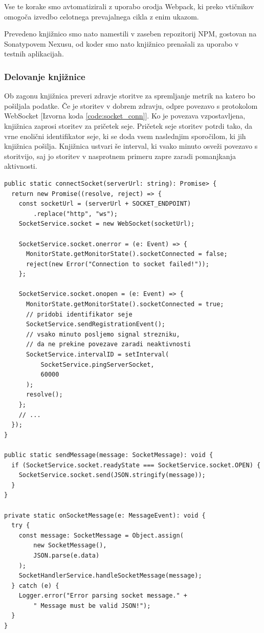 \documentclass[a4paper, 12pt]{book}
\begin{document}
Vse te korake smo avtomatizirali z uporabo orodja Webpack, ki preko vtičnikov omogoča izvedbo celotnega prevajalnega cikla z enim ukazom. 

Prevedeno knjižnico smo nato namestili v zaseben repozitorij NPM, gostovan na Sonatypovem Nexusu, od koder smo nato knjižnico prenašali za uporabo v testnih aplikacijah.

\subsubsection{Delovanje knjižnice}

Ob zagonu knjižnica preveri zdravje storitve za spremljanje metrik na katero bo pošiljala podatke. Če je storitev v dobrem zdravju, odpre povezavo s protokolom WebSocket [Izvorna koda \ref{code:socket_conn}]. Ko je povezava vzpostavljena, knjižnica zaprosi storitev za pričetek seje. Pričetek seje storitev potrdi tako, da vrne enolični identifikator seje, ki se doda vsem naslednjim sporočilom, ki jih knjižnica pošilja. Knjižnica ustvari še interval, ki vsako minuto osveži povezavo s storitvijo, saj jo storitev v nasprotnem primeru zapre zaradi pomanjkanja aktivnosti.

\begin{lstlisting}[label=code:socket_conn, caption=Odpiranje WebSocket povezave in metode za upravljanje WebSocket akcij]
public static connectSocket(serverUrl: string): Promise> {
  return new Promise((resolve, reject) => {
    const socketUrl = (serverUrl + SOCKET_ENDPOINT)
        .replace("http", "ws");
    SocketService.socket = new WebSocket(socketUrl);

    SocketService.socket.onerror = (e: Event) => {
      MonitorState.getMonitorState().socketConnected = false;
      reject(new Error("Connection to socket failed!"));
    };

    SocketService.socket.onopen = (e: Event) => {
      MonitorState.getMonitorState().socketConnected = true;
      // pridobi identifikator seje
      SocketService.sendRegistrationEvent();
      // vsako minuto posljemo signal strezniku,
      // da ne prekine povezave zaradi neaktivnosti
      SocketService.intervalID = setInterval(
          SocketService.pingServerSocket,
          60000
      );
      resolve();
    };
    // ... 
  });
}

public static sendMessage(message: SocketMessage): void {
  if (SocketService.socket.readyState === SocketService.socket.OPEN) {
    SocketService.socket.send(JSON.stringify(message));
  }
}

private static onSocketMessage(e: MessageEvent): void {
  try {
    const message: SocketMessage = Object.assign(
        new SocketMessage(),
        JSON.parse(e.data)
    );
    SocketHandlerService.handleSocketMessage(message);
  } catch (e) {
    Logger.error("Error parsing socket message." +
        " Message must be valid JSON!");
  }
}
\end{lstlisting}
\end{document}
